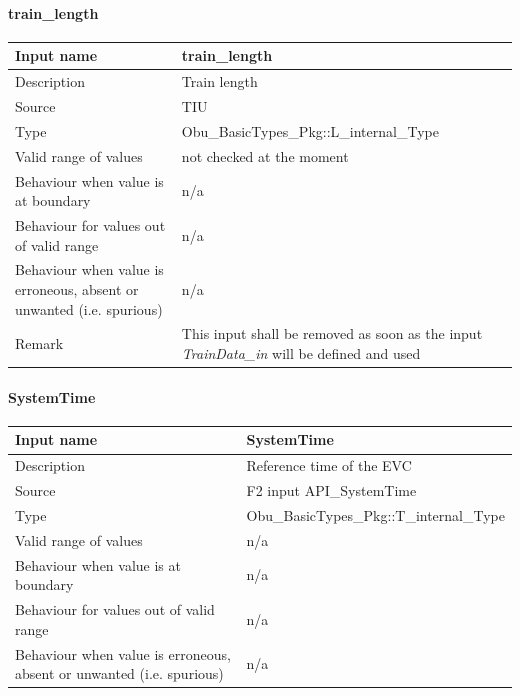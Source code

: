 \paragraph{train\_length}

\begin{longtable}{p{}p{}}
\toprule
Input name				& train\_length\\
\midrule
Description				& Train length\\
\midrule
Source					& TIU \\ 
\midrule
Type					& Obu\_BasicTypes\_Pkg::L\_internal\_Type\\
\midrule
Valid range of values	& not checked at the moment \\
\midrule
Behaviour when value is at boundary	& n/a\\
\midrule
Behaviour for values out of valid range	& n/a\\
\midrule
Behaviour when value is erroneous, absent or unwanted (i.e. spurious) & n/a\\
\midrule
Remark & This input shall be removed as soon as the input \emph{TrainData\_in} will be defined and used\\
\bottomrule


\end{longtable}

\paragraph{SystemTime}

\begin{longtable}{p{}p{}}
\toprule
Input name				& SystemTime\\
\midrule
Description				& Reference time of the EVC\\
\midrule
Source					& F2 input API\_SystemTime \\ 
\midrule
Type					& Obu\_BasicTypes\_Pkg::T\_internal\_Type\\
\midrule
Valid range of values	& n/a \\
\midrule
Behaviour when value is at boundary	& n/a\\
\midrule
Behaviour for values out of valid range	& n/a\\
\midrule
Behaviour when value is erroneous, absent or unwanted (i.e. spurious) & n/a\\

\bottomrule

\end{longtable}

